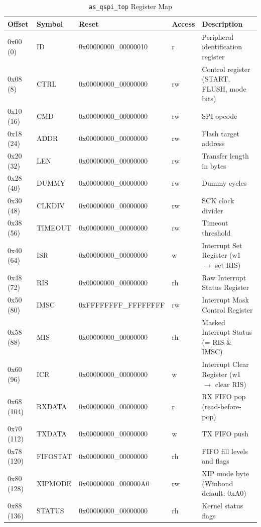 \begin{table}[H]
\caption{\texttt{as\_qspi\_top} Register Map}
\label{tab:asqspitop_regmap}
\centering
\begin{tabularx}{\textwidth}{|l|l| X| l| X|}
  \hline
  Offset & Symbol & Reset & Access & Description \\
  \hline\hline
  0x00 (0)   & ID        & \footnotesize{0x00000000\_00000010} & r   & Peripheral identification register \\
  \hline
  0x08 (8)   & CTRL      & \footnotesize{0x00000000\_00000000} & rw  & Control register (START, FLUSH, mode bits) \\
  \hline
  0x10 (16)  & CMD       & \footnotesize{0x00000000\_00000000} & rw  & SPI opcode \\
  \hline
  0x18 (24)  & ADDR      & \footnotesize{0x00000000\_00000000} & rw  & Flash target address \\
  \hline
  0x20 (32)  & LEN       & \footnotesize{0x00000000\_00000000} & rw  & Transfer length in bytes \\
  \hline
  0x28 (40)  & DUMMY   &  \footnotesize{0x00000000\_00000000} & rw  & Dummy cycles \\
  \hline
  0x30 (48)  & CLKDIV    & \footnotesize{0x00000000\_00000000} & rw  & SCK clock divider \\
  \hline
  0x38 (56)  & TIMEOUT   & \footnotesize{0x00000000\_00000000} & rw  & Timeout threshold \\
  \hline
  0x40 (64)  & ISR       & \footnotesize{0x00000000\_00000000} & w   & Interrupt Set Register (w1 $\to$ set RIS) \\
  \hline
  0x48 (72)  & RIS       & \footnotesize{0x00000000\_00000000} & rh  & Raw Interrupt Status Register \\
  \hline
  0x50 (80)  & IMSC      & \footnotesize{0xFFFFFFFF\_FFFFFFFF} & rw  & Interrupt Mask Control Register \\
  \hline
  0x58 (88)  & MIS       & \footnotesize{0x00000000\_00000000} & rh  & Masked Interrupt Status (= RIS \& IMSC) \\
  \hline
  0x60 (96)  & ICR       & \footnotesize{0x00000000\_00000000} & w   & Interrupt Clear Register (w1 $\to$ clear RIS) \\
  \hline
  0x68 (104) & RXDATA    & \footnotesize{0x00000000\_00000000} & r   & RX FIFO pop (read-before-pop) \\
  \hline
  0x70 (112) & TXDATA    & \footnotesize{0x00000000\_00000000} & w   & TX FIFO push \\
  \hline
  0x78 (120) & FIFOSTAT  & \footnotesize{0x00000000\_00000000} & rh  & FIFO fill levels and flags \\
  \hline
  0x80 (128) & XIPMODE   & \footnotesize{0x00000000\_000000A0} & rw  & XIP mode byte (Winbond default: 0xA0) \\
  \hline
  0x88 (136) & STATUS    & \footnotesize{0x00000000\_00000000} & rh  & Kernel status flags \\
  \hline
\end{tabularx}
\end{table}

